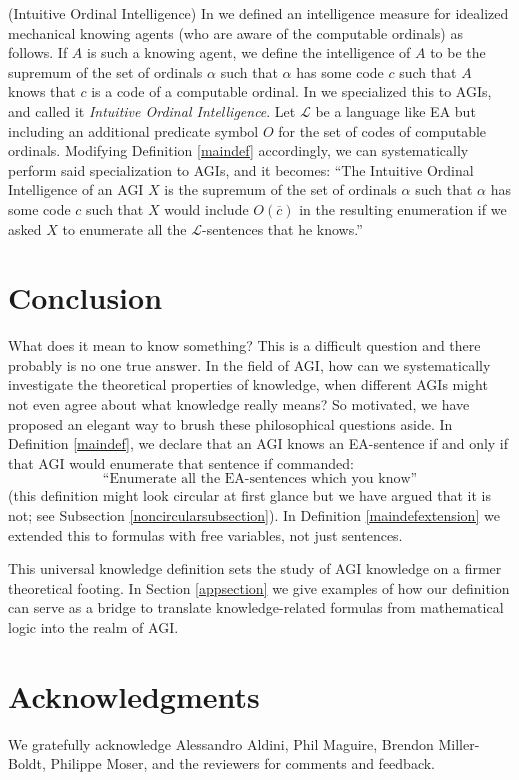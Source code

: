 \documentclass[runningheads]{llncs}
\begin{document}
\begin{example}
  (Intuitive Ordinal Intelligence) In \cite{ioi1} we defined
  an intelligence measure for idealized mechanical knowing agents (who are
  aware of the computable ordinals) as follows.
  If $A$ is such a knowing agent, we define the intelligence of $A$ to be
  the supremum of the set of ordinals $\alpha$ such that
  $\alpha$ has some code $c$ such that $A$ knows that $c$ is a code of
  a computable ordinal. In \cite{ioi2} we specialized this to AGIs, and
  called it \emph{Intuitive Ordinal Intelligence}.
  Let $\mathscr L$ be a language like EA but including an additional
  predicate symbol $O$ for the set of codes of computable ordinals.
  Modifying Definition \ref{maindef} accordingly,
  we can systematically perform said specialization to AGIs, and it becomes:
  ``The Intuitive Ordinal
  Intelligence of an AGI $X$ is the supremum of the set of ordinals $\alpha$
  such that $\alpha$ has some code $c$ such that $X$ would include $O(\overline c)$
  in the resulting enumeration if we asked $X$ to enumerate all the
  $\mathscr L$-sentences that he knows.''
\end{example}

\section{Conclusion}
\label{conclusionsection}

What does it mean to know something? This is a difficult question and there probably
is no one true answer. In the field of AGI, how can we systematically investigate
the theoretical properties of knowledge, when different AGIs might not even agree
about what knowledge really means? So motivated, we have proposed
an elegant way to brush these philosophical questions aside. In Definition \ref{maindef},
we declare that an AGI knows an EA-sentence if and
only if that AGI would enumerate that sentence if commanded:
  \[
  \text{``Enumerate all the EA-sentences which you know''}
  \]
(this definition might look circular at first glance but we have argued that it is
not; see Subsection \ref{noncircularsubsection}).
In Definition \ref{maindefextension}
we extended this to formulas with free variables, not just sentences.

This universal knowledge definition sets the study of AGI knowledge
on a firmer theoretical footing. In Section \ref{appsection} we give examples
of how our definition can serve as a bridge to translate knowledge-related
formulas from mathematical logic into the realm of AGI.

\section*{Acknowledgments}

We gratefully acknowledge Alessandro Aldini, Phil Maguire, Brendon Miller-Boldt,
Philippe Moser, and the reviewers for
comments and feedback.



\end{document}
